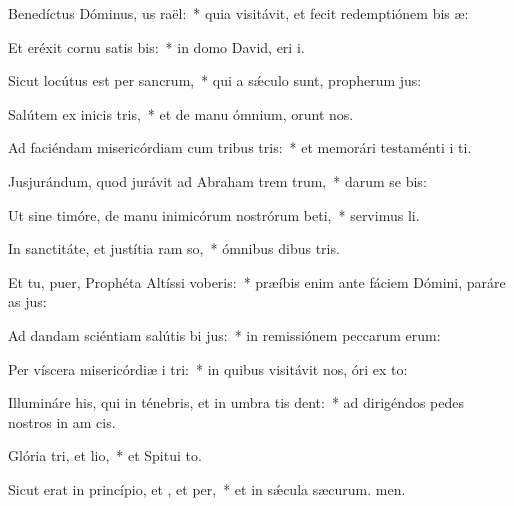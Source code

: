 \item Benedíctus Dóminus, us raël:~* quia visitávit, et fecit redemptiónem bis æ:
\item Et eréxit cornu satis bis:~* in domo David, eri i.
\item Sicut locútus est per  sancrum,~* qui a sǽculo sunt, propherum jus:
\item Salútem ex inicis tris,~* et de manu ómnium,  orunt nos.
\item Ad faciéndam misericórdiam cum tribus tris:~* et memorári testaménti i ti.
\item Jusjurándum, quod jurávit ad Abraham trem trum,~* darum se bis:
\item Ut sine timóre, de manu inimicórum nostrórum beti,~* servimus li.
\item In sanctitáte, et justítia ram so,~* ómnibus dibus tris.
\item Et tu, puer, Prophéta Altíssi voberis:~* præíbis enim ante fáciem Dómini, paráre as jus:
\item Ad dandam sciéntiam salútis bi jus:~* in remissiónem peccarum erum:
\item Per víscera misericórdiæ i tri:~* in quibus visitávit nos, óri ex to:
\item Illumináre his, qui in ténebris, et in umbra tis dent:~* ad dirigéndos pedes nostros in am cis.
\item Glória tri, et lio,~* et Spitui to.
\item Sicut erat in princípio, et , et per,~* et in sǽcula sæcurum. men.
